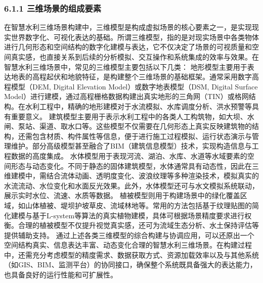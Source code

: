 {{\subsubsection{6.1.1 三维场景的组成要素}\label{ux4e09ux7ef4ux573aux666fux7684ux7ec4ux6210ux8981ux7d20}
在智慧水利三维场景构建中，三维模型是构成虚拟场景的核心要素之一，是实现现实世界数字化、可视化表达的基础。所谓三维模型，指的是对现实场景中各类物体进行几何形态和空间结构的数字化建模与表达，它不仅决定了场景的可视质量和空间真实感，也直接关系到后续的分析模拟、交互操作和系统集成的效率与效果。在智慧水利三维场景中，常见的三维模型主要包括以下几类：
地形模型主要用于表达地表的高程起伏和地貌特征，是构建整个三维场景的基础框架。通常采用数字高程模型（DEM, Digital Elevation Model）或数字地表模型（DSM, Digital Surface
Model）进行建模，通过高程栅格数据构建出真实地形的三角网（TIN）或格网结构。在水利工程中，精确的地形建模对于水流模拟、水库调度分析、洪水预警等具有重要意义。
建筑模型主要用于表示水利工程中的各类人工构筑物，如大坝、水闸、泵站、渠道、取水口等。这些模型不仅需要在几何形态上真实反映建筑物的结构，还需包含材质、构件属性等信息，便于进行施工过程模拟、运行状态演示与管理维护。部分高级模型甚至融合了BIM（建筑信息模型）技术，实现构造信息与工程数据的高度集成。
水体模型用于表现河流、湖泊、水库、水道等水域要素的空间形态与动态变化。不同于静态的固体建筑模型，水体通常具有动态性，因此在三维建模中，需结合流体动画、透明度变化、波浪纹理等多种渲染技术，模拟真实的水流流动、水位变化和水面反光效果。此外，水体模型还可与水文模拟系统联动，展示实时水位、流速、水质等数据。
植被模型则用于构建场景中的绿化覆盖区域，如山体植被、堤坝护坡草皮、流域林地等。常用的方法包括基于纹理贴图的简化建模与基于L-system等算法的真实植物建模，具体可根据场景精度要求进行权衡。合理的植被模型不仅提升视觉真实感，还可为流域生态分析、水土保持评估等提供辅助支持。
通过上述各类三维模型的综合构建与协调应用，可以还原出一个空间结构真实、信息表达丰富、动态变化合理的智慧水利三维场景。在构建过程中，还需充分考虑模型的精度需求、数据获取方式、资源加载效率以及与其他系统（如GIS、BIM、监测平台）的协同接口，确保整个系统既具备强大的表达能力，也具备良好的运行性能和可扩展性。
}}
